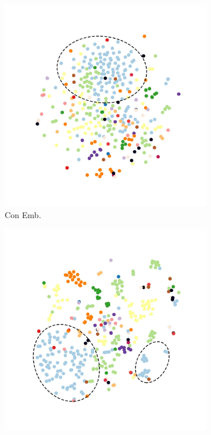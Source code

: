 \documentclass[letterpaper]{article}
\begin{document}
\begin{figure}[t]
		\begin{subfigure}{.24\textwidth}
			\centering
			\includegraphics[width=\textwidth]{Yang_Liu_doc2vec_new.pdf}
			\caption{Con Emb.}
			\label{fig:subfig:a}
		\end{subfigure}
		\begin{subfigure}{.24\textwidth}
			\centering
			\includegraphics[width=\textwidth]{Yang_Liu_emb_new.pdf}

\end{subfigure}
\end{figure}
\end{document}
